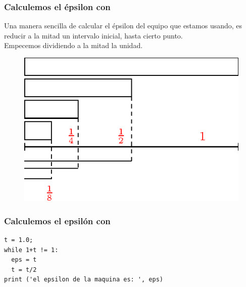 \begin{frame}[fragile]
\frametitle{Calculemos el épsilon con \python}
Una manera sencilla de calcular el épsilon del equipo que estamos usando, es reducir a la mitad un intervalo inicial, hasta cierto punto.
\\
\bigskip
\pause
Empecemos dividiendo a la mitad la unidad.
\begin{figure}
\centering
\includegraphics[scale=1]{epsilonmaquina_02.eps}
\end{figure}
\end{frame}
\begin{frame}[fragile]
\frametitle{Calculemos el epsilón con \python}
\begin{lstlisting}[caption=Código para el épsilon, style=codigopython]
t = 1.0;
while 1+t != 1:
  eps = t
  t = t/2
print ('el epsilon de la maquina es: ', eps)
\end{lstlisting}
\end{frame}

